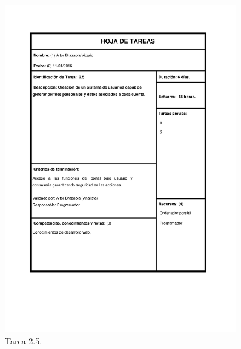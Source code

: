 \documentclass{DeustoFDP}
\begin{document}
\begin{figure}[H]
	\centering
	\includegraphics[width=0.9\textwidth]{fig/Tareas/25}
	\caption{Tarea 2.5.}
	\label{fig:t25}
\end{figure}
\end{document}
